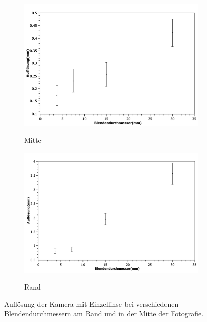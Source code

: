 \documentclass[
	a4paper,
	12pt,
	pagesize,
	ngerman
]{scrartcl}
\begin{document}
	\begin{figure}[H] %
		\centering
		\begin{subfigure}[t]{0.5\textwidth}
			\centering
			\includegraphics[width=1\textwidth]{fig_Einzellinse_mitte_aufloesung}
			\label{fig_aufl_mitte}
			\caption{Mitte}
		\end{subfigure}%
		\begin{subfigure}[t]{0.5\textwidth}
			\centering
			\includegraphics[width=1\textwidth]{fig_Einzellinse_rand_aufloesung}
			\label{fig_aufl_rand}
			\caption{Rand}
		\end{subfigure}
		\caption{
			\label{fig_aufl}
			Auflösung der Kamera mit Einzellinse bei verschiedenen Blendendurchmessern am Rand und in der Mitte der Fotografie.}
		\centering
		
	\end{figure}
	
\end{document}
